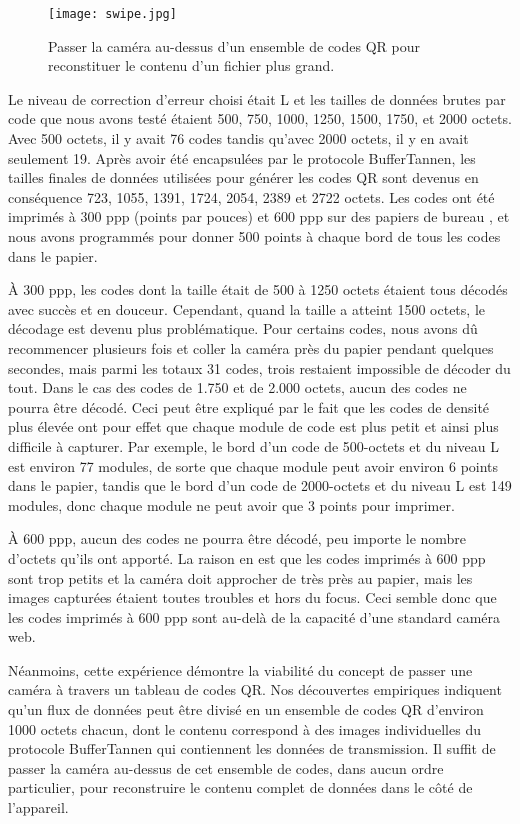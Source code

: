 \begin{figure}
\centering
\texttt{[image: swipe.jpg]}
\caption{Passer la caméra au-dessus d'un ensemble de codes QR pour reconstituer le contenu d'un fichier plus grand.}
\label{fig:qr:paper-swipe}
\end{figure}

Le niveau de correction d'erreur choisi était L et les tailles de données brutes par code que nous avons testé étaient 500, 750, 1000, 1250, 1500, 1750, et 2000 octets. Avec 500 octets, il y avait 76 codes tandis qu'avec 2000 octets, il y en avait seulement 19. Après avoir été encapsulées par le protocole BufferTannen, les tailles finales de données utilisées pour générer les codes QR sont devenus en conséquence 723, 1055, 1391, 1724, 2054, 2389 et 2722 octets. Les codes ont été imprimés à 300 ppp (points par pouces) et 600 ppp sur des papiers de bureau , et nous avons programmés pour donner 500 points à chaque bord de tous les codes dans le papier.

À 300 ppp, les codes dont la taille était de 500 à 1250 octets étaient tous décodés avec succès et en douceur. Cependant, quand la taille a atteint 1500 octets, le décodage est devenu plus problématique. Pour certains codes, nous avons dû recommencer plusieurs fois et coller la caméra près du papier pendant quelques secondes, mais parmi les totaux 31 codes, trois restaient impossible de décoder du tout. Dans le cas des codes de 1.750 et de 2.000 octets, aucun des codes ne pourra être décodé. Ceci peut être expliqué par le fait que les codes de densité plus élevée ont pour effet que chaque module de code est plus petit et ainsi plus difficile à capturer. Par exemple, le bord d'un code de 500-octets et du niveau L est environ 77 modules, de sorte que chaque module peut avoir environ 6 points dans le papier, tandis que le bord d'un code de 2000-octets et du niveau L est 149 modules, donc chaque module ne peut avoir que 3 points pour imprimer.

À 600 ppp, aucun des codes ne pourra être décodé, peu importe le nombre d'octets qu'ils ont apporté. La raison en est que les codes imprimés à 600 ppp sont trop petits et la caméra doit approcher de très près au papier, mais les images capturées étaient toutes troubles et hors du focus. Ceci semble donc que les codes imprimés à 600 ppp sont au-delà de la capacité d'une standard caméra web.

Néanmoins, cette expérience démontre la viabilité du concept de passer une caméra à travers un tableau de codes QR. Nos découvertes empiriques indiquent qu'un flux de données peut être divisé en un ensemble de codes QR d'environ 1000 octets chacun, dont le contenu correspond à des images individuelles du protocole BufferTannen qui contiennent les données de transmission. Il suffit de passer la caméra au-dessus de cet ensemble de codes, dans aucun ordre particulier, pour reconstruire le contenu complet de données dans le côté de l'appareil.

